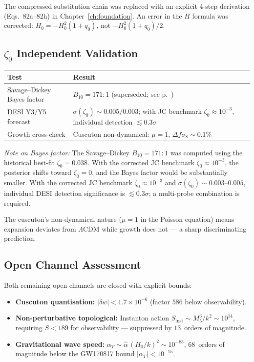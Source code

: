 The compressed substitution chain was replaced with an explicit 4-step derivation (Eqs.~82a--82h) in Chapter~\ref{ch:foundation}. An error in the $\dot{H}$ formula was corrected: $\dot{H}_0 = -H_0^2(1+q_0)$, not $-H_0^2(1+q_0)/2$.

\subsection{$\zeta_0$ Independent Validation}

\begin{center}
\begin{tabular}{l l}
\hline
Test & Result \\
\hline
Savage--Dickey Bayes factor & $B_{10} = 171\!:\!1$ (superseded; see p.~\pageref{note:bayes-caveat}) \\
DESI Y3/Y5 forecast & $\sigma(\zeta_0) \sim 0.005/0.003$; with JC benchmark $\zeta_0 \approx 10^{-3}$, individual detection $\lesssim 0.3\sigma$ \\
Growth cross-check & Cuscuton non-dynamical: $\mu = 1$, $\Delta f\sigma_8 \sim 0.1\%$ \\
\hline
\end{tabular}
\end{center}

\noindent
\textit{Note on Bayes factor:} The Savage--Dickey $B_{10} = 171\!:\!1$ was computed using the historical best-fit $\zeta_0 = 0.038$. With the corrected JC benchmark $\zeta_0 \approx 10^{-3}$, the posterior shifts toward $\zeta_0 = 0$, and the Bayes factor would be substantially smaller. With the corrected JC benchmark $\zeta_0 \approx 10^{-3}$ and $\sigma(\zeta_0) \sim 0.003$--$0.005$, individual DESI detection significance is $\lesssim 0.3\sigma$; a multi-probe combination is required.

\noindent
The cuscuton's non-dynamical nature ($\mu = 1$ in the Poisson equation) means expansion deviates from $\Lambda$CDM while growth does not --- a sharp discriminating prediction.

\subsection{Open Channel Assessment}

Both remaining open channels are closed with explicit bounds:
\begin{itemize}
\item \textbf{Cuscuton quantisation:} $|\delta w| < 1.7 \times 10^{-6}$ (factor $586$ below observability).
\item \textbf{Non-perturbative topological:} Instanton action $S_{\mathrm{inst}} \sim M_5^3/k^2 \sim 10^{14}$, requiring $S < 189$ for observability --- suppressed by $13$~orders of magnitude.
\item \textbf{Gravitational wave speed:} $\alpha_T \sim \hat{\alpha}\,(H_0/k)^2 \sim 10^{-83}$, 68~orders of magnitude below the GW170817 bound $|\alpha_T| < 10^{-15}$.
\end{itemize}

